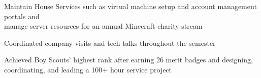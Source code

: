 

\medskip
{}

Maintain House Services such as virtual machine setup and account management portals and \\ manage server resources for an annual Minecraft charity stream

\divider

Coordinated company visits and tech talks throughout the semester

\divider

Achieved Boy Scouts' highest rank after earning 26 merit badges and designing, coordinating, and leading a 100+ hour service project

